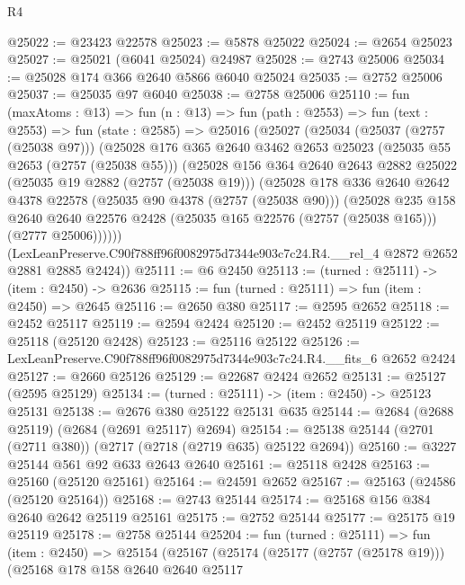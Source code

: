 \begin{lexlean}{R4}
\begin{coremodule}
@25022 := @23423 @22578
@25023 := @5878 @25022
@25024 := @2654 @25023
@25027 := @25021 (@6041 @25024) @24987
@25028 := @2743 @25006
@25034 := @25028 @174 @366 @2640 @5866 @6040 @25024
@25035 := @2752 @25006
@25037 := @25035 @97 @6040
@25038 := @2758 @25006
@25110 := fun (maxAtoms : @13) =>
  fun (n : @13) =>
  fun (path : @2553) =>
  fun (text : @2553) =>
  fun (state : @2585) =>
  @25016
    (@25027
      (@25034
        (@25037 (@2757 (@25038 @97)))
        (@25028
          @176
          @365
          @2640
          @3462
          @2653
          @25023
          (@25035 @55 @2653 (@2757 (@25038 @55)))
          (@25028
            @156
            @364
            @2640
            @2643
            @2882
            @25022
            (@25035 @19 @2882 (@2757 (@25038 @19)))
            (@25028
              @178
              @336
              @2640
              @2642
              @4378
              @22578
              (@25035 @90 @4378 (@2757 (@25038 @90)))
              (@25028
                @235
                @158
                @2640
                @2640
                @22576
                @2428
                (@25035 @165 @22576 (@2757 (@25038 @165)))
                (@2777 @25006))))))
      (LexLeanPreserve.C90f788ff96f0082975d7344e903c7c24.R4.__rel_4 @2872 @2652 @2881 @2885 @2424))
@25111 := @6 @2450
@25113 := (turned : @25111) -> (item : @2450) -> @2636
@25115 := fun (turned : @25111) => fun (item : @2450) => @2645
@25116 := @2650 @380
@25117 := @2595 @2652
@25118 := @2452 @25117
@25119 := @2594 @2424
@25120 := @2452 @25119
@25122 := @25118 (@25120 @2428)
@25123 := @25116 @25122
@25126 := LexLeanPreserve.C90f788ff96f0082975d7344e903c7c24.R4.__fits_6 @2652 @2424
@25127 := @2660 @25126
@25129 := @22687 @2424 @2652
@25131 := @25127 (@2595 @25129)
@25134 := (turned : @25111) -> (item : @2450) -> @25123 @25131
@25138 := @2676 @380 @25122 @25131 @635
@25144 := @2684 (@2688 @25119) (@2684 (@2691 @25117) @2694)
@25154 := @25138 @25144 (@2701 (@2711 @380)) (@2717 (@2718 (@2719 @635) @25122 @2694))
@25160 := @3227 @25144 @561 @92 @633 @2643 @2640
@25161 := @25118 @2428
@25163 := @25160 (@25120 @25161)
@25164 := @24591 @2652
@25167 := @25163 (@24586 (@25120 @25164))
@25168 := @2743 @25144
@25174 := @25168 @156 @384 @2640 @2642 @25119 @25161
@25175 := @2752 @25144
@25177 := @25175 @19 @25119
@25178 := @2758 @25144
@25204 := fun (turned : @25111) =>
  fun (item : @2450) =>
  @25154
    (@25167
      (@25174
        (@25177 (@2757 (@25178 @19)))
        (@25168
          @178
          @158
          @2640
          @2640
          @25117

\end{coremodule}
\end{lexlean}
